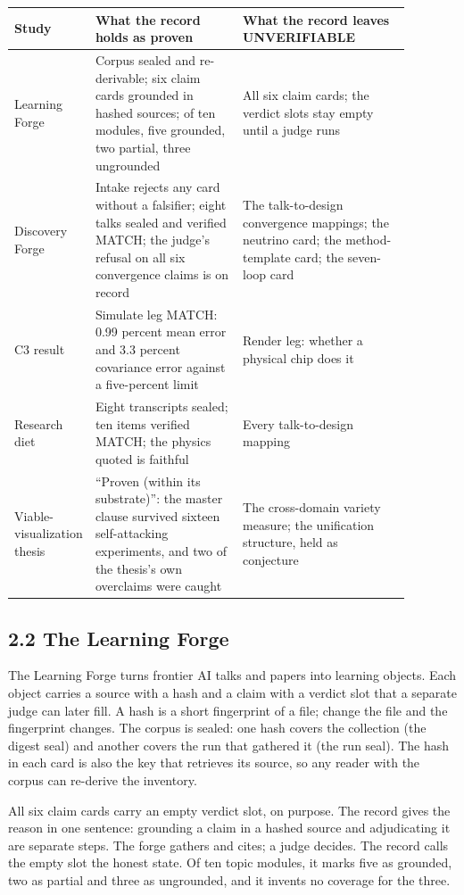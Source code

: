 \documentclass[11pt]{article}
\begin{document}
{\small\begin{longtable}{>{\raggedright\arraybackslash}p{0.078\linewidth}>{\raggedright\arraybackslash}p{0.378\linewidth}>{\raggedright\arraybackslash}p{0.424\linewidth}}
\toprule
\textbf{Study} & \textbf{What the record holds as proven} & \textbf{What the record leaves UNVERIFIABLE} \\ \midrule\endhead
Learning Forge & Corpus sealed and re-derivable; six claim cards grounded in hashed sources; of ten modules, five grounded, two partial, three ungrounded & All six claim cards; the verdict slots stay empty until a judge runs \\
Discovery Forge & Intake rejects any card without a falsifier; eight talks sealed and verified MATCH; the judge's refusal on all six convergence claims is on record & The talk-to-design convergence mappings; the neutrino card; the method-template card; the seven-loop card \\
C3 result & Simulate leg MATCH: 0.99 percent mean error and 3.3 percent covariance error against a five-percent limit & Render leg: whether a physical chip does it \\
Research diet & Eight transcripts sealed; ten items verified MATCH; the physics quoted is faithful & Every talk-to-design mapping \\
Viable-visualization thesis & ``Proven (within its substrate)'': the master clause survived sixteen self-attacking experiments, and two of the thesis's own overclaims were caught & The cross-domain variety measure; the unification structure, held as conjecture \\
\bottomrule\end{longtable}}
\subsection*{2.2 The Learning Forge}

The Learning Forge turns frontier AI talks and papers into learning objects. Each object carries a source with a hash and a claim with a verdict slot that a separate judge can later fill. A hash is a short fingerprint of a file; change the file and the fingerprint changes. The corpus is sealed: one hash covers the collection (the digest seal) and another covers the run that gathered it (the run seal). The hash in each card is also the key that retrieves its source, so any reader with the corpus can re-derive the inventory.

All six claim cards carry an empty verdict slot, on purpose. The record gives the reason in one sentence: grounding a claim in a hashed source and adjudicating it are separate steps. The forge gathers and cites; a judge decides. The record calls the empty slot the honest state. Of ten topic modules, it marks five as grounded, two as partial and three as ungrounded, and it invents no coverage for the three.
\end{document}
